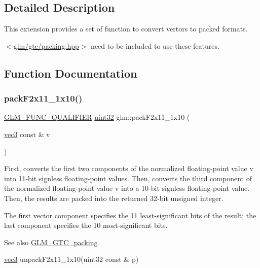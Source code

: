 \subsection{Detailed Description}
This extension provides a set of function to convert vertors to packed formats. 

$<$\mbox{\hyperlink{gtc_2packing_8hpp}{glm/gtc/packing.\+hpp}}$>$ need to be included to use these features. 

\subsection{Function Documentation}
\mbox{\label{group__gtc__packing_ga8c2a0eeee677ca4dafd9e093d9e81062}} 
\subsubsection{\texorpdfstring{packF2x11\_1x10()}{packF2x11\_1x10()}}
{\footnotesize\ttfamily \mbox{\hyperlink{setup_8hpp_a33fdea6f91c5f834105f7415e2a64407}{G\+L\+M\+\_\+\+F\+U\+N\+C\+\_\+\+Q\+U\+A\+L\+I\+F\+I\+ER}} \mbox{\hyperlink{group__gtc__type__precision_ga202b6a53c105fcb7e531f9b443518451}{uint32}} glm\+::pack\+F2x11\+\_\+1x10 (\begin{DoxyParamCaption}\item[{\mbox{\hyperlink{group__core__types_ga1c47e8b3386109bc992b6c48e91b0be7}{vec3}} const \&}]{v }\end{DoxyParamCaption})}

First, converts the first two components of the normalized floating-\/point value v into 11-\/bit signless floating-\/point values. Then, converts the third component of the normalized floating-\/point value v into a 10-\/bit signless floating-\/point value. Then, the results are packed into the returned 32-\/bit unsigned integer.

The first vector component specifies the 11 least-\/significant bits of the result; the last component specifies the 10 most-\/significant bits.

\begin{DoxySeeAlso}{See also}
\mbox{\hyperlink{group__gtc__packing}{G\+L\+M\+\_\+\+G\+T\+C\+\_\+packing}} 

\mbox{\hyperlink{group__core__types_ga1c47e8b3386109bc992b6c48e91b0be7}{vec3}} unpack\+F2x11\+\_\+1x10(uint32 const \& p) 
\end{DoxySeeAlso}


